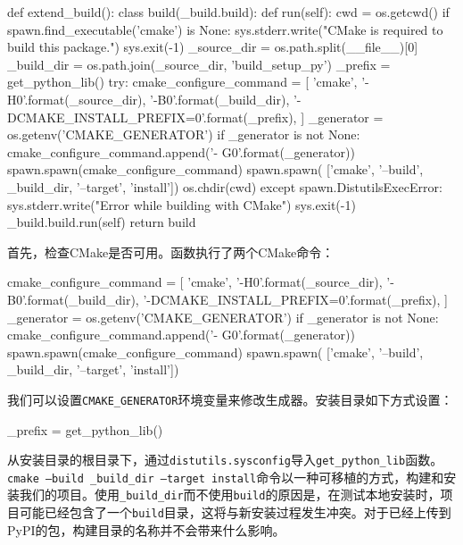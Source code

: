 \begin{codebox}[python]
def extend_build():
  class build(_build.build):
    def run(self):
      cwd = os.getcwd()
      if spawn.find_executable('cmake') is None:
        sys.stderr.write("CMake is required to build this package.\n")
        sys.exit(-1)
        _source_dir = os.path.split(__file__)[0]
        _build_dir = os.path.join(_source_dir, 'build_setup_py')
        _prefix = get_python_lib()
        try:
          cmake_configure_command = [
              'cmake',
              '-H{0}'.format(_source_dir),
              '-B{0}'.format(_build_dir),
              '-DCMAKE_INSTALL_PREFIX={0}'.format(_prefix),
          ]
          _generator = os.getenv('CMAKE_GENERATOR')
          if _generator is not None:
            cmake_configure_command.append('-
                                          G{0}'.format(_generator))
          spawn.spawn(cmake_configure_command)
          spawn.spawn(
                ['cmake', '--build', _build_dir, '--target', 'install'])
          os.chdir(cwd)
        except spawn.DistutilsExecError:
          sys.stderr.write("Error while building with CMake\n")
          sys.exit(-1)
          _build.build.run(self)
  return build
\end{codebox}

首先，检查CMake是否可用。函数执行了两个CMake命令：

\begin{codebox}[python]
cmake_configure_command = [
    'cmake',
    '-H{0}'.format(_source_dir),
    '-B{0}'.format(_build_dir),
    '-DCMAKE_INSTALL_PREFIX={0}'.format(_prefix),
]
_generator = os.getenv('CMAKE_GENERATOR')
if _generator is not None:
  cmake_configure_command.append('-
                                G{0}'.format(_generator))
spawn.spawn(cmake_configure_command)
spawn.spawn(
      ['cmake', '--build', _build_dir, '--target', 'install'])
\end{codebox}

我们可以设置\texttt{CMAKE\_GENERATOR}环境变量来修改生成器。安装目录如下方式设置：

\begin{codebox}[shell]
_prefix = get_python_lib()
\end{codebox}

从安装目录的根目录下，通过\texttt{distutils.sysconfig}导入\texttt{get\_python\_lib}函数。\texttt{cmake --build \_build\_dir --target install}命令以一种可移植的方式，构建和安装我们的项目。使用\texttt{\_build\_dir}而不使用\texttt{build}的原因是，在测试本地安装时，项目可能已经包含了一个\texttt{build}目录，这将与新安装过程发生冲突。对于已经上传到PyPI的包，构建目录的名称并不会带来什么影响。

